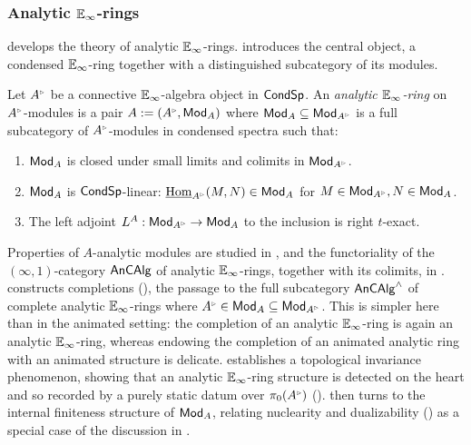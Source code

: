 \subsubsection{Analytic \texorpdfstring{$\mathbb{E}_{\infty}$}{E-infinity}-rings}\label{subsubsec: intro analytic}
 develops the theory of analytic $\mathbb{E}_{\infty}$-rings.  introduces the central object, a condensed $\mathbb{E}_{\infty}$-ring together with a distinguished subcategory of its modules.
\begin{definition*}[\ref{def: analytic E-infinity ring}]
    Let $A^{\tri}$ be a connective $\mathbb{E}_{\infty}$-algebra object in $\mathsf{Cond}\mathsf{Sp}$. An \emph{analytic $\mathbb{E}_{\infty}$-ring} on $A^{\tri}$-modules is a pair $A:=(A^{\tri},\Mod_{A})$ where $\Mod_{A}\subseteq\Mod_{A^{\tri}}$ is a full subcategory of $A^{\tri}$-modules in condensed spectra such that:
    \begin{enumerate}[label=(\roman*)]
        \item $\mathsf{Mod}_{A}$ is closed under small limits and colimits in $\Mod_{A^{\tri}}$.
        \item $\mathsf{Mod}_{A}$ is $\mathsf{Cond}\mathsf{Sp}$-linear: $\intHom_{A^{\tri}}(M,N)\in\Mod_{A}$ for $M\in\Mod_{A^{\tri}},N\in\Mod_{A}$.
        \item The left adjoint $L^{A}:\Mod_{A^{\tri}}\to\Mod_{A}$ to the inclusion is right $t$-exact.
    \end{enumerate}
\end{definition*}
Properties of $A$-analytic modules are studied in , and the functoriality of the $(\infty,1)$-category $\mathsf{An}\mathsf{CAlg}$ of analytic $\mathbb{E}_{\infty}$-rings, together with its colimits, in .  constructs completions (), the passage to the full subcategory $\mathsf{An}\mathsf{CAlg}^{\wedge}$ of complete analytic $\mathbb{E}_{\infty}$-rings where $A^{\tri}\in\Mod_{A}\subseteq\Mod_{A^{\tri}}$. This is simpler here than in the animated setting: the completion of an analytic $\mathbb{E}_{\infty}$-ring is again an analytic $\mathbb{E}_{\infty}$-ring, whereas endowing the completion of an animated analytic ring with an animated structure is delicate.  establishes a topological invariance phenomenon, showing that an analytic $\mathbb{E}_{\infty}$-ring structure is detected on the heart and so recorded by a purely static datum over $\pi_{0}(A^{\tri})$ ().  then turns to the internal finiteness structure of $\mathsf{Mod}_{A}$, relating nuclearity and dualizability () as a special case of the discussion in .
